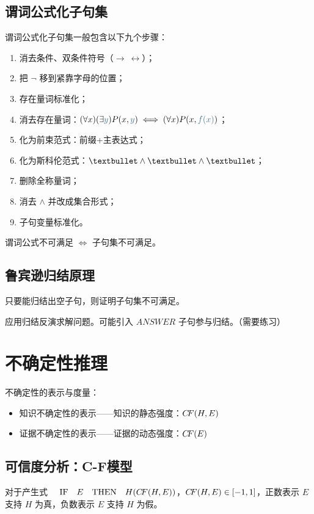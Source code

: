 \documentclass[UTF8]{ctexart}
\newcommand\col[1]{\textcolor{darkcyan}{#1}}
\newcommand\IF{\quad\textrm{IF}\quad}
\newcommand\THEN{\quad\textrm{THEN}\quad}
\newcommand\CF{{C\hspace{-0.2em}F}}
\newcommand\Emph[1]{\colorbox{green!10}{\textcolor{green!30!black}{#1}}}
\begin{document}
\subsection{谓词公式化子句集}
谓词公式化子句集一般包含以下九个步骤：
\begin{enumerate}[itemsep=0pt,parsep=0pt]
  \item 消去条件、双条件符号（$\to\ \leftrightarrow$）；
  \item 把 $\neg$ 移到紧靠字母的位置；
  \item 存在量词标准化；
  \item 消去存在量词：$(\forall x)(\exists \col{y})P(x,\col{y}) \iff (\forall x)P(x, \col{f(x)})$；
  \item 化为前束范式：前缀+主表达式；
  \item 化为斯科伦范式：$\textbullet \wedge \textbullet \wedge \textbullet$；
  \item 删除全称量词；
  \item 消去 $\wedge$ 并改成集合形式；
  \item 子句变量标准化。
\end{enumerate}

谓词公式不可满足 $\iff$ 子句集不可满足。

\subsection{鲁宾逊归结原理}
只要能归结出\Emph{空子句}，则证明子句集不可满足。

应用归结反演求解问题。可能引入 $ANSWER$ 子句参与归结。（需要练习）

\section{不确定性推理}
不确定性的表示与度量：
\begin{itemize}[itemsep=0pt,parsep=0pt]
  \item 知识不确定性的表示——知识的静态强度：$\CF (H,E)$
  \item 证据不确定性的表示——证据的动态强度：$\CF (E)$
\end{itemize}

\subsection{可信度分析：C-F模型}
对于产生式 $\IF E \THEN H (\CF (H,E))$，$\CF(H,E)\in[-1,1]$，正数表示 $E$ 支持 $H$ 为真，负数表示 $E$ 支持 $H$ 为假。
\end{document}
